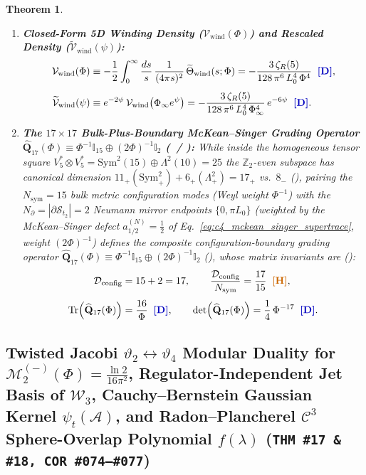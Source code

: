 \documentclass[11pt,a4paper]{article}
\newcommand{\catD}{\text{\textbf{\textcolor{blue!75!black}{[D]}}}}
\newcommand{\catH}{\text{\textbf{\textcolor{orange!80!black}{[H]}}}}
\theoremstyle{definition}
\theoremstyle{plain}
\newtheorem{theorem}[axiom]{Theorem}
\theoremstyle{remark}
\begin{document}
\begin{theorem}
\begin{enumerate}[label=(\roman*)]
\begin{align}
  \end{align}
  \item \textbf{Closed-Form 5D Winding Density ($\mathcal{V}_{\mathrm{wind}}(\Phi)$) and Rescaled Density ($\widetilde{\mathcal{V}}_{\mathrm{wind}}(\psi)$):}
  \begin{align}
  \mathcal{V}_{\mathrm{wind}}(\Phi) &\equiv -\frac{1}{2}\int_{0}^{\infty} \frac{ds}{s}\,\frac{1}{(4\pi s)^2}\,\widetilde{\Theta}_{\mathrm{wind}}(s; \Phi) = -\frac{3\,\zeta_R(5)}{128\,\pi^6\,L_0^4\,\Phi^4} \;\;\catD, \label{eq:c4_vwind_jordan} \\[4pt]
  \widetilde{\mathcal{V}}_{\mathrm{wind}}(\psi) &\equiv e^{-2\psi}\,\mathcal{V}_{\mathrm{wind}}\!\left(\Phi_\infty e^\psi\right) = -\frac{3\,\zeta_R(5)}{128\,\pi^6\,L_0^4\,\Phi_\infty^4}\,e^{-6\psi} \;\;\catD. \label{eq:c4_vwind_einstein}
  \end{align}
  \item \textbf{The $17\times 17$ Bulk-Plus-Boundary McKean--Singer Grading Operator $\widehat{\mathbf{Q}}_{17}(\Phi) \equiv \Phi^{-1}\mathbb{I}_{15} \oplus (2\Phi)^{-1}\mathbb{I}_2$ (\catD\ / \catH):}
  While inside the homogeneous tensor square $V_5^* \otimes V_5^* = \mathrm{Sym}^2(15) \oplus \Lambda^2(10) = 25$ the $\mathbb{Z}_2$-even subspace has canonical dimension $11_+ (\mathrm{Sym}^2_+) + 6_+ (\Lambda^2_+) = 17_+$ vs.\ $8_-$ (\catD), pairing the $N_{\mathrm{sym}} = 15$ bulk metric configuration modes (Weyl weight $\Phi^{-1}$) with the $N_\partial = |\partial\mathcal{S}_{t_2}| = 2$ Neumann mirror endpoints $\{0, \pi L_0\}$ (weighted by the McKean--Singer defect $a_{1/2}^{(N)} = \frac{1}{2}$ of Eq.~\eqref{eq:c4_mckean_singer_supertrace}, weight $(2\Phi)^{-1}$) defines the composite configuration-boundary grading operator $\widehat{\mathbf{Q}}_{17}(\Phi) \equiv \Phi^{-1}\mathbb{I}_{15} \oplus (2\Phi)^{-1}\mathbb{I}_2$ (\catH), whose matrix invariants are (\catD):
  \begin{align}
  \mathcal{D}_{\mathrm{config}} &= 15 + 2 = 17, \qquad
  \frac{\mathcal{D}_{\mathrm{config}}}{N_{\mathrm{sym}}} = \frac{17}{15} \;\;\catH, \nonumber \\[3pt]
  \mathrm{Tr}\!\left(\widehat{\mathbf{Q}}_{17}(\Phi)\right) &= \frac{16}{\Phi} \;\;\catD, \qquad
  \det\!\left(\widehat{\mathbf{Q}}_{17}(\Phi)\right) = \frac{1}{4}\,\Phi^{-17} \;\;\catD. \label{eq:c4_q17_invariants}
  \end{align}
\end{enumerate}
\end{theorem}

\subsection{Twisted Jacobi $\vartheta_2 \leftrightarrow \vartheta_4$ Modular Duality for $\mathcal{M}_2^{(-)}(\Phi) = \frac{\ln 2}{16\pi^2}$, Regulator-Independent Jet Basis of $\mathcal{W}_3$, Cauchy--Bernstein Gaussian Kernel $\psi_t(\mathcal{A})$, and Radon--Plancherel $\mathcal{C}^3$ Sphere-Overlap Polynomial $f(\lambda)$ (\texttt{THM~\#17 \& \#18, COR~\#074--\#077})}
\end{document}
